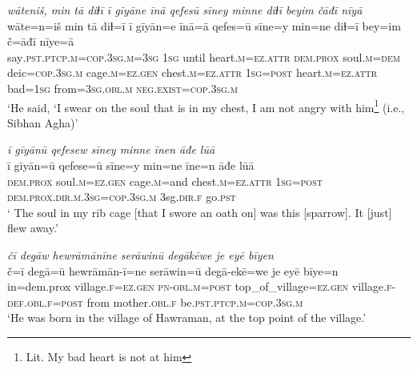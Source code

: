 \ea \label{DP.38}
\textit{wāteniš, min tā diɫī ī gīyāne īnā qefesū sīney minne diɫī beyim čāđī nīyā} \\ 
\gll wāte=n=iš min tā diɫ=ī ī gīyān=e īnā=ā qefes=ū sīne=y min=ne diɫ=ī bey=im č=āđī nīye=ā \\ 
 say\textsc{.pst}\textsc{.ptcp}\textsc{.m}\textsc{=cop}\textsc{.3sg}\textsc{.m}\textsc{=3sg} \textsc{1sg} until heart\textsc{.m}\textsc{=ez}.\textsc{attr} \textsc{dem.prox} soul\textsc{.m}\textsc{=dem} deic\textsc{=cop}\textsc{.3sg}\textsc{.m} cage\textsc{.m}\textsc{=ez}\textsc{.gen} chest\textsc{.m}\textsc{=ez}.\textsc{attr} \textsc{1sg}\textsc{=\textsc{post}} heart\textsc{.m}\textsc{=ez}.\textsc{attr} bad\textsc{=1sg} from\textsc{=3sg}\textsc{.obl}\textsc{.m} \textsc{\textsc{neg.}exist}\textsc{=cop}\textsc{.3sg}\textsc{.m} \\ 
\glt `He said, ‘I swear on the soul that is in my chest, I am not angry with him\footnote{Lit. My bad heart is not at him} (i.e., Sibhan Agha)'
\z 
 
\ea \label{DP.49}
\textit{ī gīyānū qefesew sīney minne īnen āđe lūā} \\ 
\gll ī gīyān=ū qefese=ū sīne=y min=ne īne=n āđe lūā \\ 
 \textsc{dem.prox} soul\textsc{.m}\textsc{=ez}\textsc{.gen} cage\textsc{.m}=and chest\textsc{.m}\textsc{=ez}.\textsc{attr} \textsc{1sg}\textsc{=\textsc{post}} \textsc{dem.prox}\textsc{.dir}\textsc{.m}\textsc{.3sg}\textsc{=cop}\textsc{.3sg}\textsc{.m} 3sg\textsc{.dir}\textsc{\textsc{.f}} go\textsc{.pst} \\ 
\glt ` The soul in my rib cage [that I swore an oath on] was this [sparrow]. It [just] flew away.'
\z 
 
\ea \label{ZP.3}
\textit{čī degāw hewrāmānīne serāwinū degākēwe je eyē bīyen} \\ 
\gll č=ī degā=ū hewrāmān-ī=ne serāwin=ū degā-ekē=we je eyē bīye=n \\ 
 in=dem.prox village\textsc{.f}\textsc{\textsc{=ez.gen}} \textsc{pn}\textsc{-obl}\textsc{.m}\textsc{=\textsc{post}} top\_of\_village\textsc{\textsc{=ez.gen}} village\textsc{.f}\textsc{-def}\textsc{.obl}\textsc{.f}\textsc{=\textsc{post}} from mother\textsc{.obl}\textsc{.f} be\textsc{.pst}\textsc{.ptcp}\textsc{.m}\textsc{=cop}\textsc{.3sg}\textsc{.m} \\ 
\glt `He was born in the village of Hawraman, at the top point of the village.'
\z 
 
